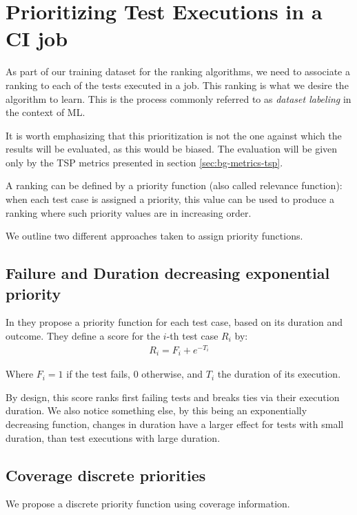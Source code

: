 \section{Prioritizing Test Executions in a CI job}\label{s:method-prioritizing-testruns}

As part of our training dataset for the ranking algorithms, we need to associate a ranking
to each of the tests executed in a job. This ranking is what we desire the algorithm to 
learn. This is the process commonly referred to as \emph{dataset labeling} in the context of ML.

It is worth emphasizing that this prioritization is not the one against which the results
will be evaluated, as this would be biased. The evaluation will be given only by the 
TSP metrics presented in section \ref{sec:bg-metrics-tsp}.

A ranking can be defined by a priority function (also called relevance function): when each 
test case is assigned a priority, this value can be used to produce a ranking where such 
priority values are in increasing order.

We outline two different approaches taken to assign priority functions.

\subsection{Failure and Duration decreasing exponential priority}

In \cite{Bertolino2020LearningtoRankVR} they propose a priority function for each test case, based on its duration and outcome.
They define a score for the $i$-th test case $R_i$ by:
\begin{align*}
R_i = F_i + e^{-T_i}
\end{align*}

Where $F_i = 1$ if the test fails, $0$ otherwise, and $T_i$ the duration of its execution.

By design, this score ranks first failing tests and breaks ties via their execution duration.
We also notice something else, by this being an exponentially decreasing function, changes
in duration have a larger effect for tests with small duration, than test executions with
large duration.

\subsection{Coverage discrete priorities}\label{s:method-prioritizingtestcases}
We propose a discrete priority function using coverage information. 

